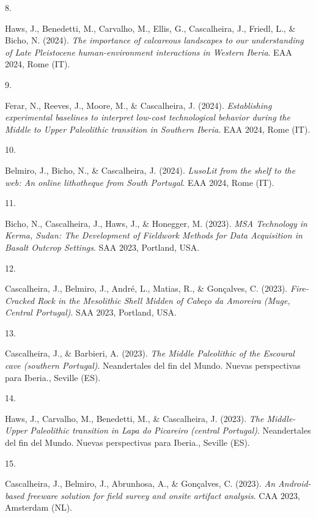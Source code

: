 \documentclass[11pt,a4paper,]{awesome-cv}
\newlength{\cslhangindent}
\newlength{\csllabelwidth}
\newenvironment{CSLReferences}[2] %
 {\begin{list}{}{%
  \setlength{\itemindent}{0pt}
  \setlength{\leftmargin}{0pt}
  \setlength{\parsep}{0pt}
  \ifodd #1
   \setlength{\leftmargin}{\cslhangindent}
   \setlength{\itemindent}{-1\cslhangindent}
  \fi
  \setlength{\itemsep}{#2\baselineskip}}}
 {\end{list}}
\newcommand{\CSLLeftMargin}[1]{\parbox[t]{\csllabelwidth}{\strut#1\strut}}
\newcommand{\CSLRightInline}[1]{\parbox[t]{\linewidth - \csllabelwidth}{\strut#1\strut}}
\begin{document}
\begin{CSLReferences}{0}{0}
\CSLLeftMargin{8. }%
\CSLRightInline{Haws, J., Benedetti, M., Carvalho, M., Ellis, G.,
Cascalheira, J., Friedl, L., \& Bicho, N. (2024). \emph{The importance
of calcareous landscapes to our understanding of Late Pleistocene
human-environment interactions in Western Iberia}. EAA 2024, Rome (IT).}

\CSLLeftMargin{9. }%
\CSLRightInline{Ferar, N., Reeves, J., Moore, M., \& Cascalheira, J.
(2024). \emph{Establishing experimental baselines to interpret low-cost
technological behavior during the Middle to Upper Paleolithic transition
in Southern Iberia}. EAA 2024, Rome (IT).}

\CSLLeftMargin{10. }%
\CSLRightInline{Belmiro, J., Bicho, N., \& Cascalheira, J. (2024).
\emph{LusoLit from the shelf to the web: An online lithotheque from
South Portugal}. EAA 2024, Rome (IT).}

\CSLLeftMargin{11. }%
\CSLRightInline{Bicho, N., Cascalheira, J., Haws, J., \& Honegger, M.
(2023). \emph{MSA Technology in Kerma, Sudan: The Development of
Fieldwork Methods for Data Acquisition in Basalt Outcrop Settings}. SAA
2023, Portland, USA.}

\CSLLeftMargin{12. }%
\CSLRightInline{Cascalheira, J., Belmiro, J., André, L., Matias, R., \&
Gonçalves, C. (2023). \emph{Fire-Cracked Rock in the Mesolithic Shell
Midden of Cabeço da Amoreira (Muge, Central Portugal)}. SAA 2023,
Portland, USA.}

\CSLLeftMargin{13. }%
\CSLRightInline{Cascalheira, J., \& Barbieri, A. (2023). \emph{The
Middle Paleolithic of the Escoural cave (southern Portugal)}.
Neandertales del fin del Mundo. Nuevas perspectivas para Iberia.,
Seville (ES).}

\CSLLeftMargin{14. }%
\CSLRightInline{Haws, J., Carvalho, M., Benedetti, M., \& Cascalheira,
J. (2023). \emph{The Middle-Upper Paleolithic transition in Lapa do
Picareiro (central Portugal)}. Neandertales del fin del Mundo. Nuevas
perspectivas para Iberia., Seville (ES).}

\CSLLeftMargin{15. }%
\CSLRightInline{Cascalheira, J., Belmiro, J., Abrunhosa, A., \&
Gonçalves, C. (2023). \emph{An Android-based freeware solution for field
survey and onsite artifact analysis}. CAA 2023, Amsterdam (NL).}


\end{CSLReferences}
\end{document}
